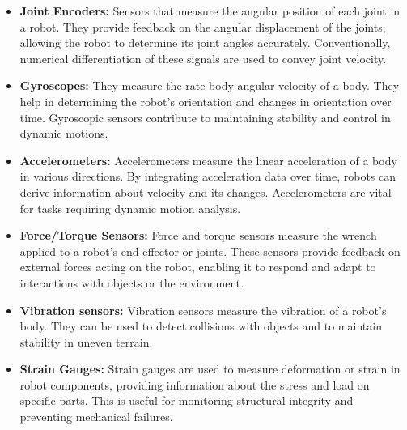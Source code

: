 \begin{itemize}
	\item \textbf{Joint Encoders:} Sensors that measure the angular position of each joint in a robot. They provide feedback on the angular displacement of the joints, allowing the robot to determine its joint angles accurately. Conventionally, numerical differentiation of these signals are used to convey joint velocity.
	
	\item \textbf{Gyroscopes:} They measure the rate body angular velocity of a body. They help in determining the robot's orientation and changes in orientation over time. Gyroscopic sensors contribute to maintaining stability and control in dynamic motions.
	
	\item \textbf{Accelerometers:} Accelerometers measure the linear acceleration of a body in various directions. By integrating acceleration data over time, robots can derive information about velocity and its changes. Accelerometers are vital for tasks requiring dynamic motion analysis.
	

	\item \textbf{Force/Torque Sensors:} Force and torque sensors measure the wrench applied to a robot's end-effector or joints. These sensors provide feedback on external forces acting on the robot, enabling it to respond and adapt to interactions with objects or the environment.
	
	\item \textbf{Vibration sensors:} Vibration sensors measure the vibration of a robot's body. They can be used to detect collisions with objects and to maintain stability in uneven terrain.
	
	\item \textbf{Strain Gauges:} Strain gauges are used to measure deformation or strain in robot components, providing information about the stress and load on specific parts. This is useful for monitoring structural integrity and preventing mechanical failures.
	
\end{itemize}

